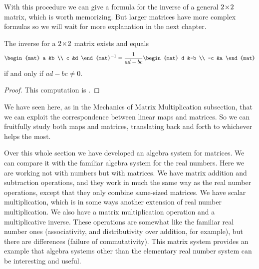With this procedure we can give a formula for 
the inverse of a general $2 \! \times \! 2$ matrix, 
which is worth memorizing.
But larger matrices have more complex formulas so 
we will wait for more explanation in the next chapter.

\begin{corollary}
\label{cor:TwoByTwoInv}
The inverse for a \( 2 \! \times \! 2 \) matrix exists and equals
\begin{equation*}
  \begin{mat}
    a  &b  \\
    c  &d
  \end{mat}^{-1}
  =
  \frac{1}{ad-bc}
  \begin{mat}
    d  &-b \\
   -c  &a
  \end{mat}
\end{equation*}
if and only if \( ad-bc\neq 0 \).
\end{corollary}
\begin{proof}
This computation is 
. 
\end{proof}

We have seen here, as in the Mechanics of Matrix Multiplication subsection,
that we can exploit the correspondence between
linear maps and matrices.
So we can fruitfully study both maps and matrices, translating back and forth
to whichever helps the most.

Over this whole 
section we have developed an algebra system for matrices.
We can compare it with the familiar algebra system for the real numbers.
Here we are working not with numbers but with matrices.
We have matrix addition and subtraction operations, 
and they work in much the same
way as the real number operations, except that they only combine same-sized
matrices.
We have scalar multiplication, which is in some ways another extension
of real number multiplication.
We also have a matrix multiplication operation 
and a multiplicative inverse.
These operations are somewhat like the familiar real number ones
(associativity, and distributivity over addition, for example), but
there are differences (failure of commutativity). 
This matrix system provides an example that algebra
systems other than the 
elementary real number system can be interesting and useful.


